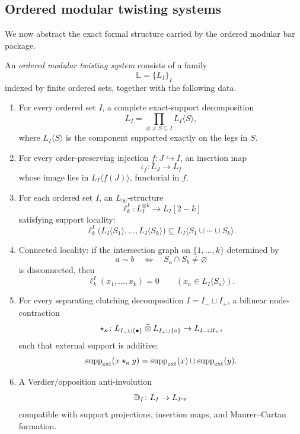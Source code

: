 \subsection{Ordered modular twisting systems}

We now abstract the exact formal structure carried by the ordered modular bar package.

\begin{definition}
\label{def:ordered-modular-twisting-system}
An \emph{ordered modular twisting system} consists of a family
\[
\mathbb L=\{L_I\}_{I}
\]
indexed by finite ordered sets, together with the following data.

\begin{enumerate}
\item
For every ordered set $I$, a complete exact-support decomposition
\[
L_I=\prod_{\varnothing\neq S\subseteq I}L_I\langle S\rangle,
\]
where $L_I\langle S\rangle$ is the component supported exactly on the legs in $S$.

\item
For every order-preserving injection $f\colon J\hookrightarrow I$, an insertion map
\[
\iota_f\colon L_J\to L_I
\]
whose image lies in $L_I\langle f(J)\rangle$, functorial in $f$.

\item
For each ordered set $I$, an $L_\infty$-structure
\[
\ell_k^I\colon L_I^{\otimes k}\to L_I[2-k]
\]
satisfying support locality:
\[
\ell_k^I\big(L_I\langle S_1\rangle,\dots,L_I\langle S_k\rangle\big)
\subseteq
L_I\langle S_1\cup\cdots\cup S_k\rangle.
\]

\item
Connected locality: if the intersection graph on $\{1,\dots,k\}$ determined by
\[
a\sim b \quad\Longleftrightarrow\quad S_a\cap S_b\neq\varnothing
\]
is disconnected, then
\[
\ell_k^I(x_1,\dots,x_k)=0
\qquad
(x_a\in L_I\langle S_a\rangle).
\]

\item
For every separating clutching decomposition $I=I_-\sqcup I_+$, a bilinear node-contraction
\[
\star_\kappa\colon
L_{I_-\sqcup\{\bullet\}}\mathbin{\widehat{\otimes}} L_{I_+\sqcup\{\circ\}}
\to
L_{I_-\sqcup I_+},
\]
such that external support is additive:
\[
\operatorname{supp}_{\mathrm{ext}}(x\star_\kappa y)
=
\operatorname{supp}_{\mathrm{ext}}(x)\sqcup \operatorname{supp}_{\mathrm{ext}}(y).
\]

\item
A Verdier/opposition anti-involution
\[
\mathbb D_I\colon L_I\to L_{I^{\mathrm{op}}}
\]
compatible with support projections, insertion maps, and Maurer--Cartan formation.
\end{enumerate}
\end{definition}

